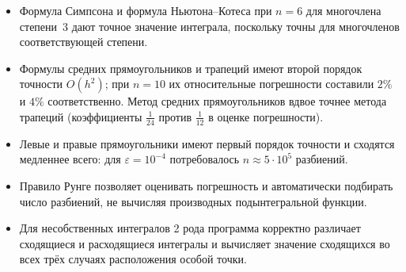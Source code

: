 \documentclass[12pt,a4paper]{article}
\begin{document}
\begin{itemize}[leftmargin=*]
  \item Формула Симпсона и формула Ньютона--Котеса при $n=6$ для многочлена степени~3 дают
        точное значение интеграла, поскольку точны для многочленов соответствующей степени.
  \item Формулы средних прямоугольников и трапеций имеют второй порядок точности $O(h^2)$;
        при $n=10$ их относительные погрешности составили $2\%$ и $4\%$ соответственно.
        Метод средних прямоугольников вдвое точнее метода трапеций (коэффициенты $\frac{1}{24}$
        против $\frac{1}{12}$ в оценке погрешности).
  \item Левые и правые прямоугольники имеют первый порядок точности и сходятся медленнее
        всего: для $\varepsilon=10^{-4}$ потребовалось $n\approx5\cdot10^{5}$ разбиений.
  \item Правило Рунге позволяет оценивать погрешность и автоматически подбирать число
        разбиений, не вычисляя производных подынтегральной функции.
  \item Для несобственных интегралов 2 рода программа корректно различает сходящиеся и
        расходящиеся интегралы и вычисляет значение сходящихся во всех трёх случаях
        расположения особой точки.
\end{itemize}
\end{document}
